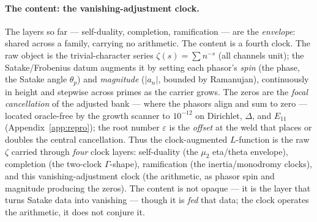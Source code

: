 \documentclass[11pt]{article}
\theoremstyle{definition}
\begin{document}
\paragraph{The content: the vanishing-adjustment clock.} The layers so far --- self-duality, completion,
ramification --- are the \emph{envelope}: shared across a family, carrying no arithmetic. The content is a
fourth clock. The raw object is the trivial-character series $\zeta(s)=\sum n^{-s}$ (all channels unit);
the Satake/Frobenius datum augments it by setting each phasor's \emph{spin} (the phase, the Satake angle
$\theta_p$) and \emph{magnitude} ($|a_n|$, bounded by Ramanujan), continuously in height and stepwise
across primes as the carrier grows. The zeros are the \emph{focal cancellation} of the adjusted bank ---
where the phasors align and sum to zero --- located oracle-free by the growth scanner to $10^{-12}$ on
Dirichlet, $\Delta$, and $E_{11}$ (Appendix~\ref{app:repro}); the root number $\varepsilon$ is the
\emph{offset} at the weld that places or doubles the central cancellation. Thus the clock-augmented
$L$-function is the raw $\zeta$ carried through \emph{four} clock
layers: self-duality (the $\mu_2$ eta/theta envelope), completion (the two-clock $\Gamma$-shape),
ramification (the inertia/monodromy clocks), and this vanishing-adjustment clock (the arithmetic, as
phasor spin and magnitude producing the zeros). The content is not opaque --- it is the layer that turns
Satake data into vanishing --- though it is \emph{fed} that data; the clock operates the arithmetic, it
does not conjure it.
\end{document}
